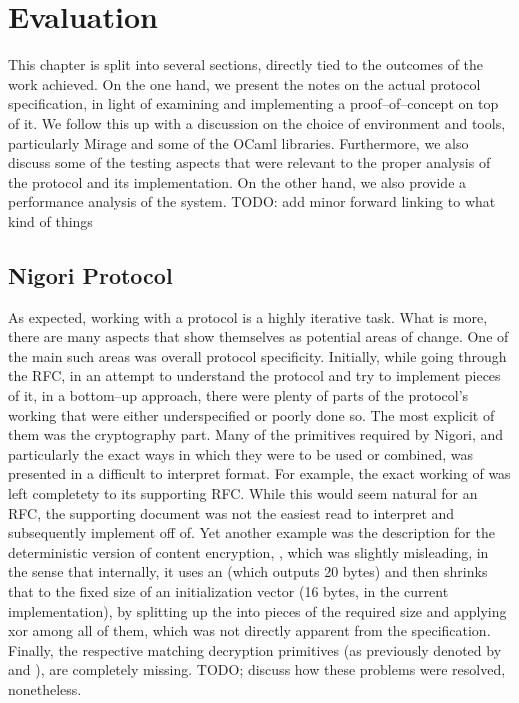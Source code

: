 \chapter{Evaluation} \label{chapter:evaluation}
This chapter is split into several sections, directly tied to the outcomes of the work achieved.
On the one hand, we present the notes on the actual protocol specification, in light of examining and implementing a proof--of--concept on top of it.
We follow this up with a discussion on the choice of environment and tools, particularly Mirage and some of the OCaml libraries.
Furthermore, we also discuss some of the testing aspects that were relevant to the proper analysis of the protocol and its implementation.
On the other hand, we also provide a performance analysis of the system. TODO: add minor forward linking to what kind of things

\section{Nigori Protocol}
As expected, working with a \wip protocol is a highly iterative task.
What is more, there are many aspects that show themselves as potential areas of change.
One of the main such areas was overall protocol specificity.
Initially, while going through the RFC, in an attempt to understand the protocol and try to implement pieces of it, in a bottom--up approach, there were plenty of parts of the protocol's working that were either underspecified or poorly done so.
The most explicit of them was the cryptography part.
Many of the primitives required by Nigori, and particularly the exact ways in which they were to be used or combined, was presented in a difficult to interpret format.
For example, the exact working of  was left completety to its supporting RFC.
While this would seem natural for an RFC, the supporting document was not the easiest read to interpret and subsequently implement off of.
Yet another example was the description for the deterministic version of content encryption, , which was slightly misleading, in the sense that internally, it uses an  (which outputs 20 bytes) and then shrinks that to the fixed size of an  initialization vector (16 bytes, in the current implementation), by splitting up the  into pieces of the required size and applying xor among all of them, which was not directly apparent from the specification.
Finally, the respective matching decryption primitives (as previously denoted by  and ), are completely missing.
TODO; discuss how these problems were resolved, nonetheless.

